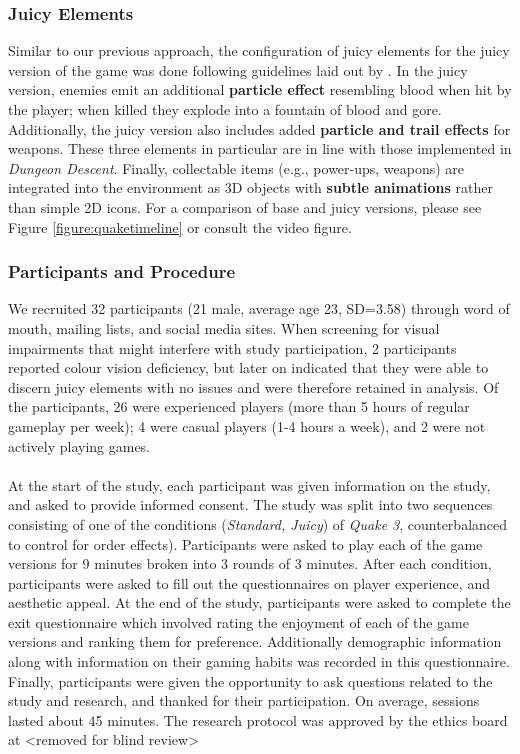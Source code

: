 \documentclass{sigchi}
\begin{document}
\subsubsection{Juicy Elements}
 Similar to our previous approach, the configuration of juicy elements for the juicy version of the game was done following guidelines laid out by \cite{deterding2015lens,hicks2018juicy,juul2016good}. In the juicy version, enemies emit an additional \textbf{particle effect} resembling blood when hit by the player; when killed they explode into a fountain of blood and gore. Additionally, the juicy version also includes added \textbf{particle and trail effects} for weapons. These three elements in particular are in line with those implemented in \textit{Dungeon Descent}. Finally, collectable items (e.g., power-ups, weapons) are integrated into the environment as 3D objects with \textbf{subtle animations} rather than simple 2D icons. For a comparison of base and juicy versions, please see Figure \ref{figure:quaketimeline} or consult the video figure.
 
 \subsubsection{Participants and Procedure}
We recruited 32 participants (21 male, average age 23, SD=3.58) through word of mouth, mailing lists, and social media sites. When screening for visual impairments that might interfere with study participation, 2 participants reported colour vision deficiency, but later on indicated that they were able to discern juicy elements with no issues and were therefore retained in analysis. Of the participants, 26 were experienced players (more than 5 hours of regular gameplay per week); 4 were casual players (1-4 hours a week), and 2 were not actively playing games. 
\\\\
At the start of the study, each participant was given information on the study, and asked to provide informed consent. 
The study was split into two sequences consisting of one of the conditions (\textit{Standard, Juicy}) of \textit{Quake 3}, counterbalanced to control for order effects). Participants were asked to play each of the game versions for 9 minutes broken into 3 rounds of 3 minutes. After each condition, participants were asked to fill out the questionnaires on player experience, and aesthetic appeal. At the end of the study, participants were asked to complete the exit questionnaire which involved rating the enjoyment of each of the game versions and ranking them for preference. Additionally demographic information along with information on their gaming habits was recorded in this questionnaire. Finally, participants were given the opportunity to ask questions related to the study and research, and thanked for their participation. On average, sessions lasted about 45 minutes. The research protocol was approved by the ethics board at <removed for blind review>
\end{document}
